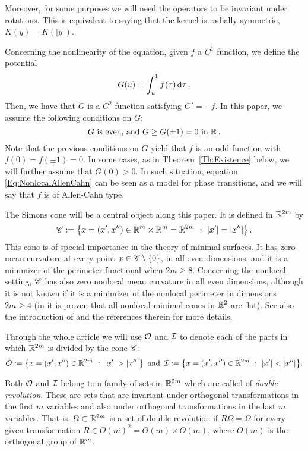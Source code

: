 Moreover, for some purposes we will need the operators to be invariant under rotations. This is equivalent to saying that the kernel is radially symmetric, $K(y) = K(|y|)$. 

Concerning the nonlinearity of the equation, given $f$ a $C^1$ function, we define the potential
$$
G(u)= \int_u^1 f(\tau) \,\mathrm{d} \tau\,.
$$
Then, we have that $G$ is a $C^2$ function satisfying $G' = -f$. In this paper, we assume the following conditions on $G$:
\begin{equation}
\label{Eq:HipothesesG}
G \textrm{ is even, and } G\geq G(\pm 1 )=0 \textrm{ in } \mathbb{R}\,.
\end{equation}
Note that the previous conditions on $G$ yield that $f$ is an odd function with $f(0)=f(\pm 1)=0$. In some cases, as in Theorem~\ref{Th:Existence} below, we will further assume that $G(0)>0$. In such situation, equation \eqref{Eq:NonlocalAllenCahn} can be seen as a model for phase transitions, and we will say that $f$ is of Allen-Cahn type.




The Simons cone will be a central object along this paper. It is defined in $\mathbb{R}^{2m}$ by
\begin{equation}
\label{Eq:SimonsCone}
\mathscr{C} := \left \{ x = (x', x'') \in \mathbb{R}^m \times \mathbb{R}^m=\mathbb{R}^{2m} \ : \ |x'| = |x''| \right \}.
\end{equation}
This cone is of special importance in the theory of minimal surfaces. It has zero mean curvature at every point $x\in \mathscr{C} \setminus \{0\}$, in all even dimensions, and it is a minimizer of the perimeter functional when $2m\geq 8$. Concerning the nonlocal setting, $\mathscr{C}$ has also zero nonlocal mean curvature in all even dimensions, although it is not known if it is a minimizer of the nonlocal perimeter in dimensions $2m\geq 4$ (in \cite{SavinValdinoci-Cones} it is proven that all nonlocal minimal cones in $\mathbb{R}^2$ are flat). See also the introduction of \cite{Felipe-Sanz-Perela:SaddleFractional} and the references therein for more details.

Through the whole article we will use $\mathcal{O}$ and $\mathcal{I}$ to denote each of the parts in which $\mathbb{R}^{2m}$ is divided by the cone $\mathscr{C}$:
$$
\mathcal{O}:= \left \{ x = (x', x'') \in \mathbb{R}^{2m} \ : \ |x'| > |x''| \right \} \textrm{ and } \,
\mathcal{I}:= \left \{ x = (x', x'') \in \mathbb{R}^{2m} \ : \ |x'| < |x''| \right \}\!.
$$

Both $\mathcal{O}$ and $\mathcal{I}$ belong to a family of sets in $\mathbb{R}^{2m}$ which are called of \emph{double revolution}. These are sets that are invariant under orthogonal transformations in the first $m$ variables and also under orthogonal transformations in the last $m$ variables. That is, $\Omega\subset \mathbb{R}^{2m}$ is a set of double revolution if $R\Omega = \Omega$ for every given transformation $R\in O(m)^2 = O(m) \times O(m)$, where  $O(m)$ is the orthogonal group of $\mathbb{R}^m$.


